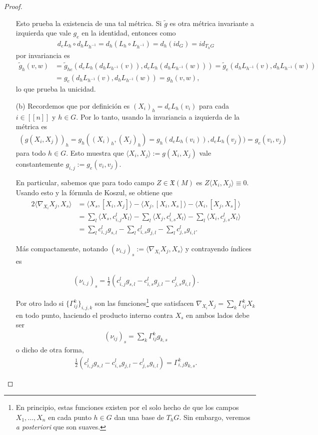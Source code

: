 \documentclass[11pt]{article}
\newcommand{\X}{\mathfrak{X}}
\newcommand{\nat}[1]{[\![#1]\!]}
\newcommand{\ip}[1]{\langle #1 \rangle}
\begin{document}
\begin{proof}
\begin{itemize}[listparindent = \parindent]
Esto prueba la existencia de una tal métrica. Si $\widetilde{g}$ es otra métrica invariante a izquierda que vale $g_e$ en la identidad, entonces como
\begin{align*}
d_eL_h \circ d_hL_{h^{-1}} = d_h(L_h \circ L_{h^{-1}}) = d_h(id_G) = id_{T_hG} 
\end{align*}
por invariancia es
\begin{align*}
\widetilde{g}_h(v,w) &= \widetilde{g}_{he}(d_eL_h(d_hL_{h^{-1}}(v)),d_eL_h(d_hL_{h^{-1}}(w)))= \widetilde{g}_e(d_hL_{h^{-1}}(v),d_hL_{h^{-1}}(w))\\&= g_e(d_hL_{h^{-1}}(v),d_hL_{h^{-1}}(w)) = g_h(v,w),
\end{align*}
lo que prueba la unicidad.
\item[(b)] Recordemos que por definición es $(X_i)_h = d_eL_h(v_i)$ para cada $i \in \nat{n}$ y $h \in G$. Por lo tanto, usando la invariancia a izquierda de la métrica es
\begin{align*}
(g(X_i,X_j))_h = g_h((X_i)_h,(X_j)_h) = g_h(d_eL_h(v_i)),d_eL_h(v_j)) = g_e(v_i,v_j)
\end{align*}
para todo $h \in G$. Esto muestra que $\ip{X_i,X_j} := g(X_i,X_j)$ vale constantemente $g_{i,j} := g_e(v_i,v_j)$. 

En particular, sabemos que para todo campo $Z \in \X(M)$ es $Z \ip{X_i,X_j} \equiv 0$. Usando esto y la fórmula de Koszul, se obtiene que
\begin{align*}
2\ip{\nabla_{X_i}X_j,X_s} &= \ip{X_s,[X_i,X_j]} - \ip{X_j,[X_i,X_s]} - \ip{X_i,[X_j,X_s]}\\
&= \sum_l\ip{X_s,c^l_{i,j}X_l} - \sum_l\ip{X_j,c^l_{i,s}X_l} - \sum_l\ip{X_i,c^l_{j,s}X_l}\\
&= \sum_l c^l_{i,j}g_{s,l} - \sum_lc^l_{i,s}g_{j,l} - \sum_lc^l_{j,s}g_{i,l}.
\end{align*} 

Más compactamente, notando $(\nu_{i,j})_s := \ip{\nabla_{X_i}X_j,X_s}$ y contrayendo índices es

\begin{align*}
(\nu_{i,j})_s = \frac{1}{2}\left(c^l_{i,j}g_{s,l} - c^l_{i,s}g_{j,l} - c^l_{j,s}g_{i,l}\right).
\end{align*}

Por otro lado si $\{\Gamma_{ij}^k\}_{i,j,k}$ son las funciones\footnote{En principio, estas funciones existen por el solo hecho de que los campos $X_1, \dots, X_n$ en cada punto $h \in G$ dan una base de $T_hG$. Sin embargo, veremos \textit{a posteriori} que son suaves.} que satisfacen $\nabla_{X_i}X_j = \sum_k \Gamma_{ij}^k X_k$ en todo punto, haciendo el producto interno contra $X_s$ en ambos lados debe ser
\begin{align*}
(\nu_{ij})_s = \sum_k\Gamma_{ij}^k g_{k,s}
\end{align*}
o dicho de otra forma,
\begin{align*}
\frac{1}{2}\left(c^l_{i,j}g_{s,l} - c^l_{i,s}g_{j,l} - c^l_{j,s}g_{i,l}\right) = \Gamma_{i,j}^kg_{k,s}.
\end{align*}


\end{itemize}
\end{proof}
\end{document}
